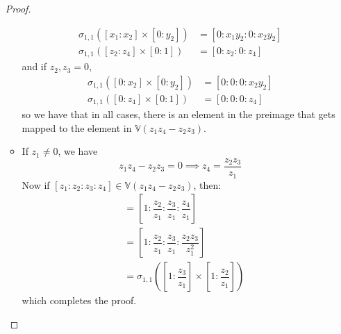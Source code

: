 \documentclass{article}
\begin{document}
\begin{itemize}
\begin{proof}
\begin{itemize}
\begin{align*}
                                \sigma_{ 1, 1}([x_{1} : x_{2}] \times [ 0 : y_{2}]) &= [0 : x_{1}y_{2} : 0 : x_{2}y_{2}] \\
                                \sigma_{ 1, 1}([z_{2} : z_{4}] \times [ 0 : 1])                                               &= [0 : z_{2} : 0 : z_{4}]             
                            \end{align*}
                        and if $z_{2}, z_{3} = 0$, 
                            \begin{align*}
                                \sigma_{1, 1}([0 : x_{2}] \times [ 0 : y_{2}]) &= [0 : 0 : 0 : x_{2}y_{2}] \\
                                \sigma_{1, 1}([0 : z_{4}] \times [ 0 : 1]) &= [0 : 0 : 0 : z_{4}]
                            \end{align*}
                        so we have that in all cases, there is an element in the preimage that gets mapped to the element in $\mathbb{V}(z_{1}z_{4} - z_{2}z_{3})$.

                        \item If $z_{1} \neq 0$, we have
                            \begin{equation*}
                                z_{1}z_{4} - z_{2}z_{3} = 0 \implies z_{ 4} = \dfrac{z_{2}z_{3}}{z_{1}}
                            \end{equation*}
                        Now if $[z_{1} : z_{2} : z_{3} : z_{4}] \in \mathbb{ V}(z_{1}z_{4} - z_{2}z_{3})$, then:
                            \begin{align*}
                                [z_{1} : z_{2} : z_{3} : z_{4}] &= [1 : \dfrac{z_{2}}{z_{1}} : \dfrac{z_{3}}{z_{1}} : \dfrac{z_{4}}{z_{1}}] \\
                                                                &= [1 : \dfrac{z_{2}}{z_{1}} : \dfrac{z_{3}}{z_{1}} : \dfrac{z_{2}z_{3}}{z_{1}^{2}}] \\
                                                                &= \sigma_{1, 1}([1 : \dfrac{z_{3}}{z_{1}}] \times [ 1 : \dfrac{z_{2}}{z_{1}}])
                            \end{align*}
                        which completes the proof.

                    \end{itemize}
            \end{proof}


\end{itemize}
\end{document}
